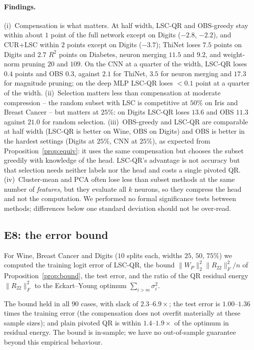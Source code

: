 \documentclass[11pt,a4paper]{article}
\theoremstyle{remark}\newtheorem{remark}{Remark}
\begin{document}
\paragraph{Findings.} (i)~Compensation is what matters. At half width, LSC-QR and OBS-greedy stay within about $1$ point of the full network except on Digits ($-2.8$, $-2.2$), and CUR+LSC within $2$ points except on Digits ($-3.7$); ThiNet loses $7.5$ points on Digits and $2.7$ $R^2$ points on Diabetes, neuron merging $11.5$ and $9.2$, and weight-norm pruning $20$ and $109$. On the CNN at a quarter of the width, LSC-QR loses $0.4$ points and OBS $0.3$, against $2.1$ for ThiNet, $3.5$ for neuron merging and $17.3$ for magnitude pruning; on the deep MLP LSC-QR loses $<0.1$ point at a quarter of the width. (ii)~Selection matters less than compensation at moderate compression -- the random subset with LSC is competitive at $50\%$ on Iris and Breast Cancer -- but matters at $25\%$: on Digits LSC-QR loses $13.6$ and OBS $11.3$ against $21.0$ for random selection. (iii)~OBS-greedy and LSC-QR are comparable at half width (LSC-QR is better on Wine, OBS on Digits) and OBS is better in the hardest settings (Digits at $25\%$, CNN at $25\%$), as expected from Proposition~\ref{prop:equiv}: it uses the same compensation but chooses the subset greedily with knowledge of the head. LSC-QR's advantage is not accuracy but that selection needs neither labels nor the head and costs a single pivoted QR. (iv)~Cluster-mean and PCA often lose less than subset methods at the same number of \emph{features}, but they evaluate all $k$ neurons, so they compress the head and not the computation. We performed no formal significance tests between methods; differences below one standard deviation should not be over-read.

\subsection{E8: the error bound}\label{sec:e8}
For Wine, Breast Cancer and Digits ($10$ splits each, widths $25$, $50$, $75\%$) we computed the training logit error of LSC-QR, the bound $\|W_P\|_2^2\|R_{22}\|_F^2/n$ of Proposition~\ref{prop:bound}, the test error, and the ratio of the QR residual energy $\|R_{22}\|_F^2$ to the Eckart--Young optimum $\sum_{i>m}\sigma_i^2$.
\begin{table}[ht]\centering\small
\caption{Medians over 10 splits. ``Bound/actual'': bound divided by the training logit error; ``rel.\ test error'': test logit error divided by the logit variance.}\label{tab:e8}

\end{table}
The bound held in all $90$ cases, with slack of $2.3$--$6.9\times$; the test error is $1.00$--$1.36$ times the training error (the compensation does not overfit materially at these sample sizes); and plain pivoted QR is within $1.4$--$1.9\times$ of the optimum in residual energy. The bound is in-sample; we have no out-of-sample guarantee beyond this empirical behaviour.
\end{document}
